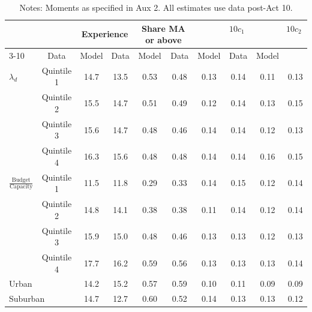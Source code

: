\documentclass[notitlepage,12pt]{article}%
\begin{document}
\bigskip

\begin{table}[ptb]
\caption{Model Fit: Average District Employee Characteristics $(d^{\ast
}\left(  \cdot\right)  =d)$}%
\begin{tabular}
[c]{lccccccccc}\hline\hline
\multicolumn{2}{l}{\ \ \ \ \ \ } & \multicolumn{2}{c}{Experience} &
\multicolumn{2}{c}{Share MA or above} &
\multicolumn{2}{c}{\ \ \ \ \ \ $10c_{1}$ \ \ \ } &
\multicolumn{2}{c}{\ \ \ \ \ \ $10c_{2}$ \ \ \ }\\\cline{3-10}%
\multicolumn{2}{l}{District Group \ \ \ \ \ \ } & Data & Model & Data &
Model & Data & Model & Data & Model\\\hline
$\lambda_{d}$ & Quintile 1 & 14.7 & 13.5 & 0.53 & 0.48 & 0.13 & 0.14 & 0.11 &
0.13\\
\multicolumn{1}{r}{} & Quintile 2 & 15.5 & 14.7 & 0.51 & 0.49 & 0.12 & 0.14 &
0.13 & 0.15\\
\multicolumn{1}{r}{} & Quintile 3 & 15.6 & 14.7 & 0.48 & 0.46 & 0.14 & 0.14 &
0.12 & 0.13\\
\multicolumn{1}{r}{} & Quintile 4 & 16.3 & 15.6 & 0.48 & 0.48 & 0.14 & 0.14 &
0.16 & 0.15\\
$\frac{\text{Budget}}{\text{Capacity}}$ & Quintile 1 & 11.5 & 11.8 & 0.29 &
0.33 & 0.14 & 0.15 & 0.12 & 0.14\\
\multicolumn{1}{r}{} & Quintile 2 & 14.8 & 14.1 & 0.38 & 0.38 & 0.11 & 0.14 &
0.12 & 0.14\\
\multicolumn{1}{r}{} & Quintile 3 & 15.9 & 15.0 & 0.48 & 0.46 & 0.13 & 0.13 &
0.12 & 0.13\\
\multicolumn{1}{r}{} & Quintile 4 & 17.7 & 16.2 & 0.59 & 0.56 & 0.13 & 0.13 &
0.13 & 0.14\\
\multicolumn{2}{l}{Urban} & 14.2 & 15.2 & 0.57 & 0.59 & 0.10 & 0.11 & 0.09 &
0.09\\
\multicolumn{2}{l}{Suburban} & 14.7 & 12.7 & 0.60 & 0.52 & 0.14 & 0.13 &
0.13 & 0.12\\\hline\hline
\end{tabular}

\caption*{{\footnotesize Notes: Moments as specified in Aux 2. All
estimates use data post-Act 10.}}
\end{table}
\end{document}
